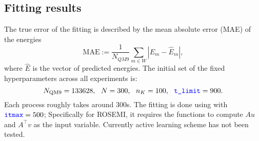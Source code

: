 \documentclass[12pt]{article}
\begin{document}
\subsection{Fitting results}
\label{subsec:fitting}
The true error of the fitting is described by the mean absolute error (MAE) of the energies
\begin{equation}
	\text{MAE} := \frac{1}{N_{QM9}}\sum_{m \in W}|E_{m} - \hat{E}_m|,
\end{equation}
where $\hat{E}$ is the vector of predicted energies.
The initial set of the fixed hyperparameters across all experiments is:
\begin{equation*}
	N_\text{QM9} = 133628, ~~ N = 300,~~ n_K = 100, ~~\codeword{t_limit} = 900.
\end{equation*}
Each  process roughly takes around 300s. 
The fitting is done using  with $\codeword{itmax} = 500$; Specifically for ROSEMI, it requires the functions to compute $Au$ and $A^\top v$ as the input variable. 
Currently active learning scheme has not been tested.
\end{document}
